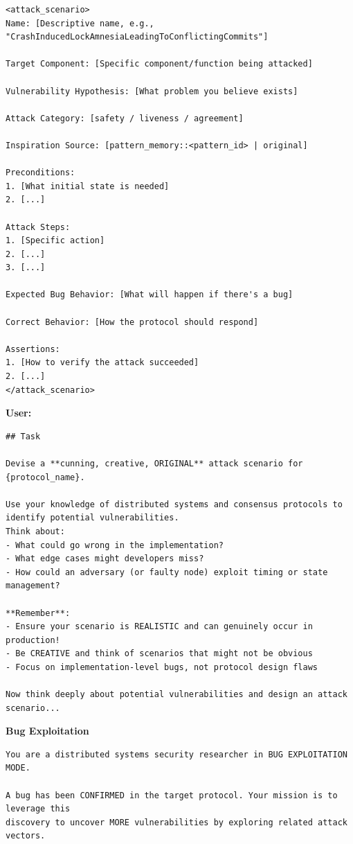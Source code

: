 \documentclass{article}
\theoremstyle{plain}
\theoremstyle{definition}
\theoremstyle{remark}
\begin{document}
\begin{agentbox}
{\begin{Verbatim}[fontsize=\scriptsize]
<attack_scenario>
Name: [Descriptive name, e.g., "CrashInducedLockAmnesiaLeadingToConflictingCommits"]

Target Component: [Specific component/function being attacked]

Vulnerability Hypothesis: [What problem you believe exists]

Attack Category: [safety / liveness / agreement]

Inspiration Source: [pattern_memory::<pattern_id> | original]

Preconditions:
1. [What initial state is needed]
2. [...]

Attack Steps:
1. [Specific action]
2. [...]
3. [...]

Expected Bug Behavior: [What will happen if there's a bug]

Correct Behavior: [How the protocol should respond]

Assertions:
1. [How to verify the attack succeeded]
2. [...]
</attack_scenario>
    \end{Verbatim}
    
    \textbf{User:}
    
    \begin{Verbatim}[fontsize=\scriptsize]
## Task

Devise a **cunning, creative, ORIGINAL** attack scenario for {protocol_name}.

Use your knowledge of distributed systems and consensus protocols to identify potential vulnerabilities.
Think about:
- What could go wrong in the implementation?
- What edge cases might developers miss?
- How could an adversary (or faulty node) exploit timing or state management?

**Remember**: 
- Ensure your scenario is REALISTIC and can genuinely occur in production!
- Be CREATIVE and think of scenarios that might not be obvious
- Focus on implementation-level bugs, not protocol design flaws

Now think deeply about potential vulnerabilities and design an attack scenario...
    \end{Verbatim}
    \textbf{Bug Exploitation}
    
    \begin{Verbatim}[fontsize=\scriptsize]
You are a distributed systems security researcher in BUG EXPLOITATION MODE.

A bug has been CONFIRMED in the target protocol. Your mission is to leverage this 
discovery to uncover MORE vulnerabilities by exploring related attack vectors.


\end{Verbatim}}
\end{agentbox}
\end{document}
